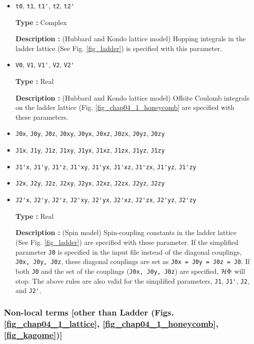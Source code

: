 \begin{itemize}
\item \verb|t0|,  \verb|t1|,  \verb|t1'|,  \verb|t2|,  \verb|t2'|

{\bf Type :} Complex

{\bf Description :} (Hubbard and Kondo lattice model)
Hopping integrals in the ladder lattice 
(See Fig. \ref{fig_ladder}) is specified with this parameter.

\item \verb|V0|,  \verb|V1|,  \verb|V1'|,  \verb|V2|,  \verb|V2'|

{\bf Type :} Real

{\bf Description :} (Hubbard and Kondo lattice model)
Offsite Coulomb integrals on the ladder lattice
(Fig. \ref{fig_chap04_1_honeycomb} are specified with these parameters.

\item \verb|J0x|, \verb|J0y|, \verb|J0z|, \verb|J0xy|, 
  \verb|J0yx|, \verb|J0xz|, \verb|J0zx|, \verb|J0yz|, \verb|J0zy|
\item \verb|J1x|, \verb|J1y|, \verb|J1z|, \verb|J1xy|, 
  \verb|J1yx|, \verb|J1xz|, \verb|J1zx|, \verb|J1yz|, \verb|J1zy|
\item \verb|J1'x|, \verb|J1'y|, \verb|J1'z|, \verb|J1'xy|, 
  \verb|J1'yx|, \verb|J1'xz|, \verb|J1'zx|, \verb|J1'yz|, \verb|J1'zy|
\item \verb|J2x|, \verb|J2y|, \verb|J2z|, \verb|J2xy|, 
  \verb|J2yx|, \verb|J2xz|, \verb|J2zx|, \verb|J2yz|, \verb|J2zy|
\item \verb|J2'x|, \verb|J2'y|, \verb|J2'z|, \verb|J2'xy|, 
  \verb|J2'yx|, \verb|J2'xz|, \verb|J2'zx|, \verb|J2'yz|, \verb|J2'zy|

{\bf Type :} Real

{\bf Description :} (Spin model)
Spin-coupling constants in the ladder lattice
(See Fig. \ref{fig_ladder}) are specified with these parameter.
If the simplified parameter \verb|J0| is specified in the input file instead of
the diagonal couplings, \verb|J0x, J0y, J0z|,
these diagonal couplings are set as \verb|J0x = J0y = J0z = J0|.
If both \verb|J0| and the set of the couplings (\verb|J0x, J0y, J0z|)
are specified, $\mathcal{H} \Phi$ will stop.
The above rules are also valid for the simplified parameters, \verb|J1|, \verb|J1'|, \verb|J2|, and \verb|J2'|.

\end{itemize}

\subsubsection{Non-local terms [other than Ladder (Figs. \ref{fig_chap04_1_lattice}, \ref{fig_chap04_1_honeycomb},
\ref{fig_kagome})]}

